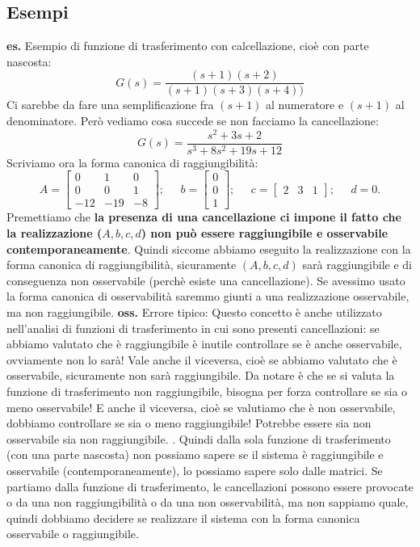 \subsection{Esempi}
\textbf{es.} Esempio di funzione di trasferimento con calcellazione, cioè con parte nascosta:
\[
    G(s) = \frac{(s+1) (s+2)}{(s+1)(s+3)(s+4))}
\]
Ci sarebbe da fare una semplificazione fra $(s+1)$ al numeratore e $(s+1)$ al denominatore. Però vediamo cosa succede se non facciamo la cancellazione:
\[
    G(s) = \frac{s^2 + 3s + 2}{s^3+8s^2 +19 s + 12}
\]
Scriviamo ora la forma canonica di raggiungibilità:
\[
    A= \left[\begin{matrix}
        0 & 1 & 0\\
        0 & 0 & 1\\
        -12 & -19 & -8
    \end{matrix}\right]; \;\;\;\;\;b = \left[\begin{matrix}
        0 \\0\\1
    \end{matrix}\right]; \;\;\;\;\; c=\left[\begin{matrix}
        2&3&1
    \end{matrix}\right]; \;\;\;\;\;d=0.
\]
Premettiamo che \textbf{la presenza di una cancellazione ci impone il fatto che la realizzazione ($A,b,c,d$) non può essere raggiungibile e osservabile contemporaneamente}. Quindi siccome abbiamo eseguito la realizzazione con la forma canonica di raggiungibilità, sicuramente $(A,b,c,d)$ sarà raggiungibile e di conseguenza non osservabile (perchè esiste una cancellazione). Se avessimo usato la forma canonica di osservabilità saremmo giunti a una realizzazione osservabile, ma non raggiungibile.\newline
\textbf{oss.} Errore tipico: Questo concetto è anche utilizzato nell'analisi di funzioni di trasferimento in cui sono presenti cancellazioni: se abbiamo valutato che è raggiungibile è inutile controllare se è anche osservabile, ovviamente non lo sarà! Vale anche il viceversa, cioè se abbiamo valutato che è osservabile, sicuramente non sarà raggiungibile. Da notare è che se si valuta la funzione di trasferimento non raggiungibile, bisogna per forza controllare se sia o meno osservabile! E anche il viceversa, cioè se valutiamo che è non osservabile, dobbiamo controllare se sia o meno raggiungibile! Potrebbe essere sia non osservabile sia non raggiungibile.
\newline
{}.\newline
\newline
Quindi dalla sola funzione di trasferimento (con una parte nascosta) non possiamo sapere se il sistema è raggiungibile e osservabile (contemporaneamente), lo possiamo sapere solo dalle matrici. Se partiamo dalla funzione di trasferimento, le cancellazioni possono essere provocate o da una non raggiungibilità o da una non osservabilità, ma non sappiamo quale, quindi dobbiamo decidere se realizzare il sistema con la forma canonica osservabile o raggiungibile.
\newpage

